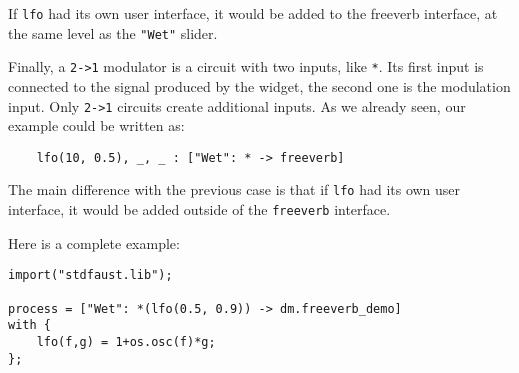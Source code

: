 If \lstinline`lfo` had its own user interface, it would be added to the freeverb interface, at the same level as the \lstinline`"Wet"` slider. 

Finally, a \lstinline`2->1` modulator is a circuit with two inputs, like \lstinline`*`. Its first input is connected to the signal produced by the widget, the second one is the modulation input. Only \lstinline`2->1` circuits create additional inputs. As we already seen, our example could be written as:

\begin{lstlisting}
	lfo(10, 0.5), _, _ : ["Wet": * -> freeverb]
\end{lstlisting}
	
The main difference with the previous case is that if \lstinline`lfo` had its own user interface, it would be added outside of the \lstinline`freeverb` interface.

Here is a complete example:

\begin{lstlisting}
import("stdfaust.lib");

process = ["Wet": *(lfo(0.5, 0.9)) -> dm.freeverb_demo]
with {
    lfo(f,g) = 1+os.osc(f)*g;
};
\end{lstlisting}
